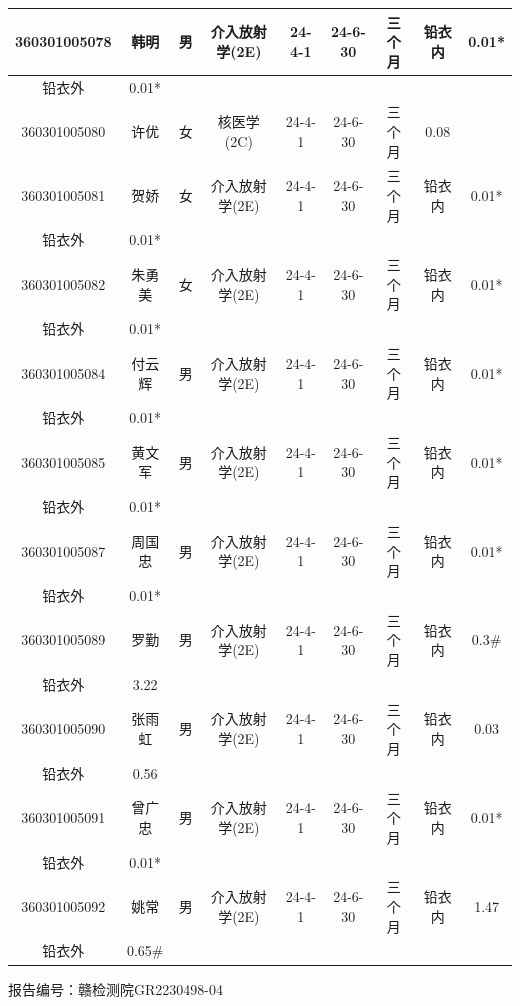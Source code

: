 \begin{table}[H]
\begin{tabular}{|c|c|c|c|c|c|c|c|c|}
\hline
360301005078 & 韩明 & 男 & 介入放射学(2E) & 24-4-1 & 24-6-30 & 三个月 & 铅衣内 & 0.01* \\
\hline
铅衣外 & 0.01* &  &  &  &  &  &  &  \\
\hline
360301005080 & 许优 & 女 & 核医学(2C) & 24-4-1 & 24-6-30 & 三个月 & 0.08 &  \\
\hline
360301005081 & 贺娇 & 女 & 介入放射学(2E) & 24-4-1 & 24-6-30 & 三个月 & 铅衣内 & 0.01* \\
\hline
铅衣外 & 0.01* &  &  &  &  &  &  &  \\
\hline
360301005082 & 朱勇美 & 女 & 介入放射学(2E) & 24-4-1 & 24-6-30 & 三个月 & 铅衣内 & 0.01* \\
\hline
铅衣外 & 0.01* &  &  &  &  &  &  &  \\
\hline
360301005084 & 付云辉 & 男 & 介入放射学(2E) & 24-4-1 & 24-6-30 & 三个月 & 铅衣内 & 0.01* \\
\hline
铅衣外 & 0.01* &  &  &  &  &  &  &  \\
\hline
360301005085 & 黄文军 & 男 & 介入放射学(2E) & 24-4-1 & 24-6-30 & 三个月 & 铅衣内 & 0.01* \\
\hline
铅衣外 & 0.01* &  &  &  &  &  &  &  \\
\hline
360301005087 & 周国忠 & 男 & 介入放射学(2E) & 24-4-1 & 24-6-30 & 三个月 & 铅衣内 & 0.01* \\
\hline
铅衣外 & 0.01* &  &  &  &  &  &  &  \\
\hline
360301005089 & 罗勤 & 男 & 介入放射学(2E) & 24-4-1 & 24-6-30 & 三个月 & 铅衣内 & 0.3\# \\
\hline
铅衣外 & 3.22 &  &  &  &  &  &  &  \\
\hline
360301005090 & 张雨虹 & 男 & 介入放射学(2E) & 24-4-1 & 24-6-30 & 三个月 & 铅衣内 & 0.03 \\
\hline
铅衣外 & 0.56 &  &  &  &  &  &  &  \\
\hline
360301005091 & 曾广忠 & 男 & 介入放射学(2E) & 24-4-1 & 24-6-30 & 三个月 & 铅衣内 & 0.01* \\
\hline
铅衣外 & 0.01* &  &  &  &  &  &  &  \\
\hline
360301005092 & 姚常 & 男 & 介入放射学(2E) & 24-4-1 & 24-6-30 & 三个月 & 铅衣内 & 1.47 \\
\hline
铅衣外 & 0.65\# &  &  &  &  &  &  &  \\
\hline
\end{tabular}
\end{table}


报告编号：赣检测院GR2230498-04

